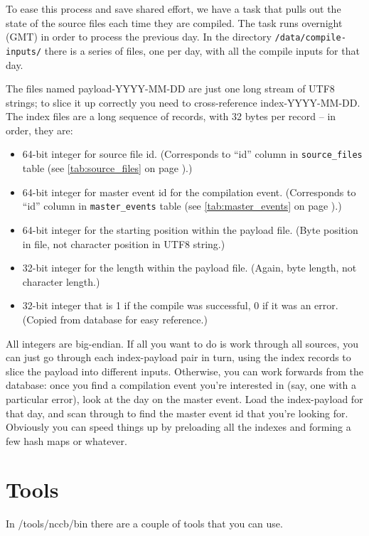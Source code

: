 \documentclass{report}
\newcommand{\myref}[1]{\autoref{#1} on page \pageref*{#1}}
\newcommand{\tabref}[1]{\lstinline|#1| table (see \myref{tab:#1})}
\begin{document}
To ease this process and save shared effort, we have a task that pulls
out the state of the source files each time they are compiled.  The
task runs overnight (GMT) in order to process the previous day.  In
the directory \texttt{/data/compile-inputs/} there is a series of files, one
per day, with all the compile inputs for that day.

The files named payload-YYYY-MM-DD are just one long stream of UTF8 strings;
to slice it up correctly you need to cross-reference
index-YYYY-MM-DD.  The index files are a long sequence of records,
with 32 bytes per record -- in order, they are:

\begin{itemize}
\item 64-bit integer for source file id.  (Corresponds to ``id'' column in
\tabref{source_files}.)
\item 64-bit integer for master event id for the compilation
event. (Corresponds to ``id'' column in \tabref{master_events}.)
\item 64-bit integer for the starting position within the payload
file. (Byte position in file, not character position in UTF8 string.)
\item 32-bit integer for the length within the payload file. (Again, byte
length, not character length.)
\item 32-bit integer that is 1 if the compile was successful, 0 if it was an
error.  (Copied from database for easy reference.)
\end{itemize}

All integers are big-endian.  If all you want to do is work
through all sources, you can just go through each index-payload pair
in turn, using the index records to slice the payload into different
inputs.  Otherwise, you can work forwards from the database: once you
find a compilation event you're interested in (say, one with a
particular error), look at the day on the master event.  Load the
index-payload for that day, and scan through to find the master event
id that you're looking for.  Obviously you can speed things up by
preloading all the indexes and forming a few hash maps or whatever.

\section{Tools}

In /tools/nccb/bin there are a couple of tools that you can use.
\end{document}
